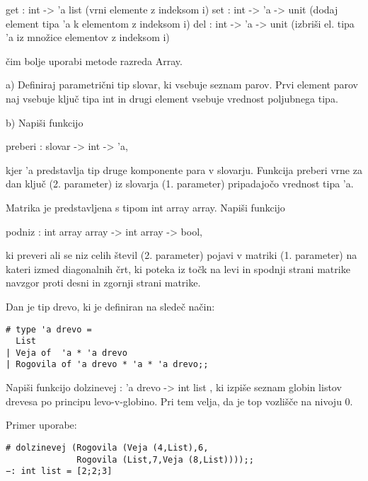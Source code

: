 \begin{ex}
get : int -> 'a list             (vrni elemente z indeksom i) 
set : int -> 'a -> unit    (dodaj element tipa 'a k elementom z indeksom i)
del : int -> 'a -> unit   (izbri\v si el. tipa 'a iz mno\v zice elementov z indeksom i)

\v cim bolje uporabi metode razreda Array. 


\end{ex} \begin{ex}
a) Definiraj parametri\v cni tip slovar, ki vsebuje seznam parov. Prvi element parov naj vsebuje klju\v c tipa int in drugi element vsebuje vrednost poljubnega tipa. 

b) Napi\v si funkcijo 

preberi : slovar -> int -> 'a, 

kjer 'a predstavlja tip druge komponente para v slovarju. Funkcija preberi vrne za dan klju\v c (2. parameter) iz slovarja (1. parameter) pripadajo\v co vrednost tipa 'a.


\end{ex} \begin{ex}
Matrika je predstavljena s tipom int array array. Napi\v si funkcijo 

podniz : int array array -> int array -> bool,

ki preveri ali se niz celih \v stevil (2. parameter) pojavi v matriki (1. parameter) na kateri izmed diagonalnih \v crt, ki poteka iz to\v ck na levi in spodnji strani matrike navzgor proti desni in zgornji strani matrike.


\end{ex} \begin{ex}
Dan je tip drevo, ki je definiran na slede\v c na\v cin:

\begin{verbatim}
# type 'a drevo =
  List
| Veja of  'a * 'a drevo
| Rogovila of 'a drevo * 'a * 'a drevo;;

\end{verbatim}
Napi\v si funkcijo dolzinevej : 'a drevo -> int list , ki izpi\v se seznam globin listov drevesa po principu levo-v-globino. Pri tem velja, da je top vozli\v s\v ce na nivoju 0.

Primer uporabe:

\begin{verbatim}
# dolzinevej (Rogovila (Veja (4,List),6,
              Rogovila (List,7,Veja (8,List))));;
−: int list = [2;2;3]

\end{verbatim}


\end{ex}
